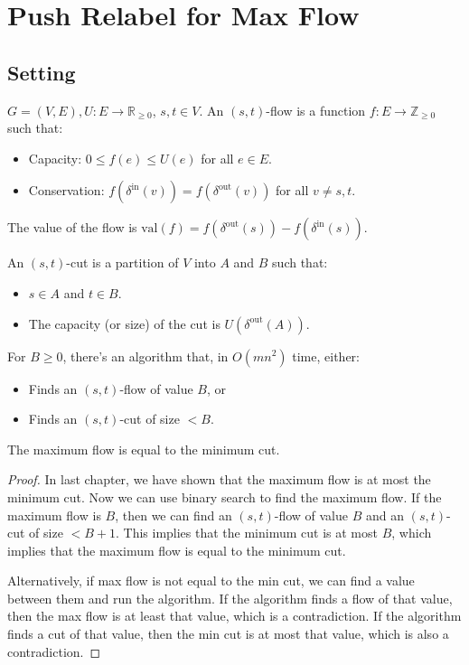 \chapter{Push Relabel for Max Flow}

\section{Setting}

\begin{definition}
  $G = (V,E), U: E \to \mathbb{R}_{\geq 0}$, $s,t \in V$.
  An $(s,t)$-flow is a function $f: E \to \mathbb{Z}_{\geq 0}$ such that:
  \begin{itemize}
    \item Capacity: $0\leq f(e) \leq U(e)$ for all $e \in E$.
    \item Conservation: $f(\delta^{\text{in}}(v)) = f(\delta^{\text{out}}(v))$ for all $v \neq s,t$.
    \end{itemize}
    The value of the flow is $\text{val}(f) = f(\delta^{\text{out}}(s)) - f(\delta^{\text{in}}(s))$.
\end{definition}

\begin{definition}[$(s,t)$-cut]
  An $(s,t)$-cut is a partition of $V$ into $A$ and $B$ such that:
  \begin{itemize}
    \item $s \in A$ and $t \in B$.
    \item The capacity (or size) of the cut is $U(\delta^{\text{out}}(A))$.
  \end{itemize}
\end{definition}

\begin{theorem}\label{thm:max-flow-min-cut}
  For $B\geq 0$, there's an algorithm that, in $O(mn^2)$ time, either:
  \begin{itemize}
    \item Finds an $(s,t)$-flow of value $B$, or
    \item Finds an $(s,t)$-cut of size $<B$.
  \end{itemize}
\end{theorem}

\begin{corollary}
  The maximum flow is equal to the minimum cut.
\end{corollary}
\begin{proof}
  In last chapter, we have shown that the maximum flow is at most the minimum cut. Now we can use binary search to find the maximum flow. If the maximum flow is $B$, then we can find an $(s,t)$-flow of value $B$ and an $(s,t)$-cut of size $<B+1$. This implies that the minimum cut is at most $B$, which implies that the maximum flow is equal to the minimum cut.

  Alternatively, if max flow is not equal to the min cut, we can find a value between them and run the algorithm. If the algorithm finds a flow of that value, then the max flow is at least that value, which is a contradiction. If the algorithm finds a cut of that value, then the min cut is at most that value, which is also a contradiction.
\end{proof}

